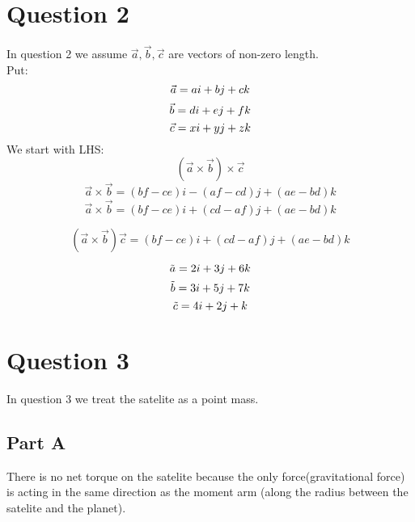 \documentclass[12pt]{article}
\begin{document}
\begin{itemize}
\pagebreak
\section{Question 2}
In question 2 we assume $\vec{a},\vec{b},\vec{c}$ are vectors of non-zero length. \\
Put: \\
\begin{equation}
\vec{a}=ai+bj+ck\\
\end{equation}
\begin{equation}
\vec{b}=di+ej+fk\\
\end{equation}
\begin{equation}
\vec{c}=xi+yj+zk\\
\end{equation}
We start with LHS: \\
\begin{displaymath}
(\vec{a} \times \vec{b}) \times \vec{c}
\end{displaymath}
\begin{displaymath}
\vec{a} \times \vec{b}=(bf-ce)i-(af-cd)j+(ae-bd)k
\end{displaymath}
\begin{displaymath}
\vec{a} \times \vec{b}=(bf-ce)i+(cd-af)j+(ae-bd)k
\end{displaymath}

\begin{displaymath}
(\vec{a} \times \vec{b}) \vec {c} =(bf-ce)i+(cd-af)j+(ae-bd)k 
\end{displaymath}

\begin{equation}
\tilde{a}=2i+3j+6k \\
\end{equation}
\begin{equation}
\tilde{b}=3i+5j+7k \\
\end{equation}
\begin{equation}
\tilde{c}=4i+2j+k \\
\end{equation}


\pagebreak
\section{Question 3}
In question 3 we treat the satelite as a point mass.
\subsection{Part A}
There is no net torque on the satelite because the only force(gravitational force) is acting in the same direction as the moment arm (along the radius between the satelite and the planet). 

\end{itemize}
\end{document}
